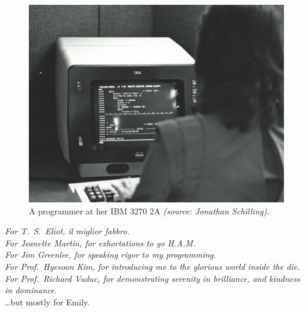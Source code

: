 \documentclass[letterpaper,10pt]{article}
\begin{document}
\vspace*{1.25in}
\begin{figure}[!htb]
\centering
\includegraphics[width=1\linewidth]{media/ibm3270.jpg}
\caption[A programmer at her IBM 3270]{A programmer at her IBM 3270 2A \textit{(source: Jonathan Schilling)}.}
\end{figure}
\clearpage
\vspace*{1in}
\begin{center}
  \textit{For T.\ S.\ Eliot, il miglior fabbro.} \\
  \vspace{.25in}
  \textit{For Jeanette Martin, for exhortations to go H.A.M. \\
  \vspace{.25in}
  For Jim Greenlee, for speaking rigor to my programming.\\
  \vspace{.25in}
    For Prof.\ Hyesoon Kim, for introducing me to the glorious world
    inside the die.\\
  \vspace{.25in}
    For Prof.\ Richard Vuduc, for demonstrating serenity in brilliance, and kindness in dominance.\\}
  \vspace{1in}\ldots but mostly for Emily.
\end{center}
\clearpage

\tableofcontents
\end{document}
